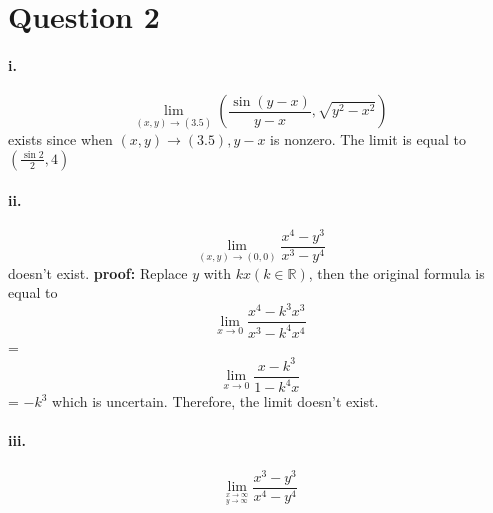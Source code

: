 \documentclass[11pt, a4paper]{article}
\begin{document}
\section*{Question 2}
\paragraph{i.}
$$\lim_{(x, y) \to (3.5)} (\frac{\sin (y - x)}{y - x}, \sqrt{y ^ 2 - x ^ 2})$$ exists  since when $(x, y) \to (3.5), y - x$ is nonzero. The limit is equal to $(\frac{\sin 2}{2}, 4)$
\paragraph{ii.}
$$\lim_{(x, y) \to (0, 0)} \frac{x ^ 4 - y ^ 3}{x ^ 3 - y ^ 4}$$ doesn't exist.
\textbf{proof:} Replace $y$ with $kx (k \in \mathbb{R})$, then the original formula is equal to $$\lim_{x \to 0} \frac{x ^ 4 - k ^ 3 x ^ 3}{x ^ 3 - k ^ 4 x ^ 4}$$ = $$\lim_{x \to 0} \frac{x - k ^ 3}{1 - k ^ 4 x}$$ = $-k ^ 3$ which is uncertain. Therefore, the limit doesn't exist.
\paragraph{iii.}
$$\lim\limits_{^{x \to \infty}_{y \to \infty}} \frac{x ^ 3 - y ^ 3}{x ^ 4 - y ^ 4}$$ 
\end{document}
